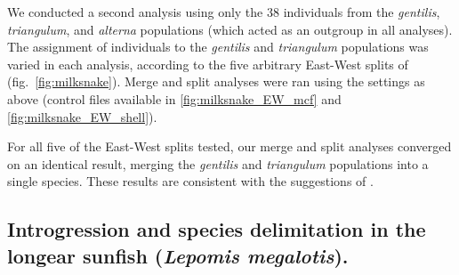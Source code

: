 \documentclass{article1}
\newcommand{\red}[1]{{\color{red}{#1}}}
\newcommand{\blue}[1]{{\color{blue}{#1}}}
\begin{document}
We conducted a second analysis using only the 38 individuals from the \textit{gentilis},
\textit{triangulum}, and \textit{alterna} populations (which acted as an outgroup in all
analyses).  The assignment of individuals to the \textit{gentilis} and \textit{triangulum}
populations was varied in each analysis, according to the five arbitrary East-West splits
of \cite{Chambers2020} (fig.~\ref{fig:milksnake}).  Merge and split analyses were ran
using the settings as above (control files available in \ref{fig:milksnake_EW_mcf} and
\ref{fig:milksnake_EW_shell}).

For all five of the East-West splits tested, our merge and split analyses converged on an
identical result, merging the \textit{gentilis} and \textit{triangulum} populations into a
single species.  These results are consistent with the suggestions of \cite{Chambers2020}.

\red{[Comment on the $\sim$0 estimates of migration rates between geographic populations.]}\blue{[As patterns of hybridization or migration for nuclear genes were not specified in the Chambers and Hillis paper, and only nuclear genes were used in the analysis, the model was run without migration (just MSC), thus no migration rates were estimated (See control files in S5 an S6)]}


\subsection{Introgression and species delimitation in the longear sunfish (\emph{Lepomis
megalotis}).}
\end{document}
